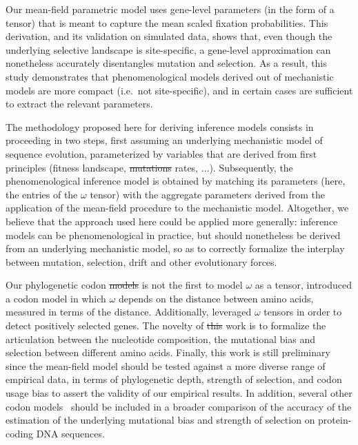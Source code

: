 \documentclass{article}
\providecommand{\DIFaddtex}[1]{{\protect\color{blue}\uwave{#1}}} %
\providecommand{\DIFdeltex}[1]{{\protect\color{red}\sout{#1}}}                      %
\providecommand{\DIFaddbegin}{} %
\providecommand{\DIFaddend}{} %
\providecommand{\DIFdelbegin}{} %
\providecommand{\DIFdelend}{} %
\providecommand{\DIFadd}[1]{\texorpdfstring{\DIFaddtex{#1}}{#1}} %
\providecommand{\DIFdel}[1]{\texorpdfstring{\DIFdeltex{#1}}{}} %
\begin{document}
Our mean-field parametric model uses gene-level parameters (in the form of a tensor) that is meant to capture the mean scaled fixation probabilities.
This derivation, and its validation on simulated data, shows that, even though the underlying selective landscape is site-specific, a gene-level approximation can nonetheless accurately disentangles mutation and selection.
As a result, this study demonstrates that phenomenological models derived out of mechanistic models are more compact (i.e.~not site-specific), and in certain cases are sufficient to extract the relevant parameters.

The methodology proposed here for deriving inference models consists in proceeding in two steps, first assuming an underlying mechanistic model of sequence evolution, parameterized by variables that are derived from first principles (fitness landscape, \DIFdelbegin \DIFdel{mutations }\DIFdelend \DIFaddbegin \DIFadd{mutation }\DIFaddend rates, $\hdots$).
Subsequently, the phenomenological inference model is obtained by matching its parameters (here, the entries of the $\omega$ tensor) with the aggregate parameters derived from the application of the mean-field procedure to the mechanistic model.
Altogether, we believe that the approach used here could be applied more generally: inference models can be phenomenological in practice, but should nonetheless be derived from an underlying mechanistic model, so as to correctly formalize the interplay between mutation, selection, drift and other evolutionary forces.

Our phylogenetic codon \DIFdelbegin \DIFdel{models }\DIFdelend \DIFaddbegin \DIFadd{model }\DIFaddend is not the first to model $\omega$ as a tensor\DIFaddbegin \DIFadd{.
Thus}\DIFaddend , \citet{Yang1998a} introduced a codon model in which $\omega$ depends on the distance between amino acids, measured in terms of the \citet{Grantham1974} distance.
Additionally, \citet{Tang2006} leveraged  $\omega$ tensors in order to detect positively selected genes.
The novelty of \DIFdelbegin \DIFdel{this }\DIFdelend \DIFaddbegin \DIFadd{the present }\DIFaddend work is to formalize the articulation between the nucleotide composition, the mutational bias and selection between different amino acids.
Finally, this work is still preliminary since the mean-field model should be tested against a more diverse range of empirical data, in terms of phylogenetic depth, strength of selection, and {codon usage bias} to assert the validity of our empirical results.
In addition, several other codon models~\citep{Rodrigue2008a,KosakovskyPond2020} should be included in a broader comparison of the accuracy of the estimation of the underlying mutational bias and strength of selection on protein-coding {DNA} sequences.
\end{document}
